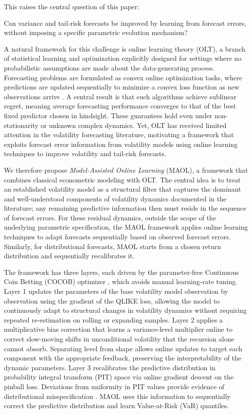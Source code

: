 This raises the central question of this paper:

Can variance and tail-risk forecasts be improved by learning from forecast errors, without imposing a specific parametric evolution mechanism?

A natural framework for this challenge is online learning theory (OLT), a branch of statistical learning and optimization explicitly designed for settings where no probabilistic assumptions are made about the data-generating process. Forecasting problems are formulated as convex online optimization tasks, where predictions are updated sequentially to minimize a convex loss function as new observations arrive \citep{cesa2006prediction, ShalevShwartz2012, hazan2016introduction}. A central result is that such algorithms achieve sublinear regret, meaning average forecasting performance converges to that of the best fixed predictor chosen in hindsight. These guarantees hold even under non-stationarity or unknown complex dynamics. Yet, OLT has received limited attention in the volatility forecasting literature, motivating a framework that exploits forecast error information from volatility models using online learning techniques to improve volatility and tail-risk forecasts.

We therefore propose \textit{Model-Assisted Online Learning} (MAOL), a framework that combines classical econometric modeling with OLT. The central idea is to treat an established volatility model as a structural filter that captures the dominant and well-understood components of volatility dynamics documented in the literature; any remaining predictive information then must reside in the sequence of forecast errors. For these residual dynamics, outside the scope of the underlying parametric specification, the MAOL framework applies online learning techniques to adapt forecasts sequentially based on observed forecast errors. Similarly, for distributional forecasts, MAOL starts from a chosen return distribution and sequentially recalibrates it.

The framework has three layers, each driven by the parameter-free Continuous Coin Betting (COCOB) optimizer \citep{orabona2017training}, which avoids manual learning-rate tuning. Layer 1 updates the parameters of the base volatility model observation by observation using the gradient of the QLIKE loss, allowing the model to continuously adapt to structural changes in volatility dynamics without requiring repeated re-estimation on rolling or expanding samples. Layer 2 applies a multiplicative bias correction that learns a variance-level multiplier online to correct slow-moving shifts in unconditional volatility that the recursion alone cannot absorb. Separating level from shape allows online updates to target each component with the appropriate feedback, preserving the interpretability of the dynamic parameters. Layer 3 recalibrates the predictive distribution in probability integral transform (PIT) space via online gradient descent on the pinball loss. Deviations from uniformity in PIT values provide evidence of distributional misspecification \citep{diebold1998evaluating, Berkowitz2001}. MAOL uses this information to sequentially correct the predictive distribution and learn Value-at-Risk (VaR) quantiles.

